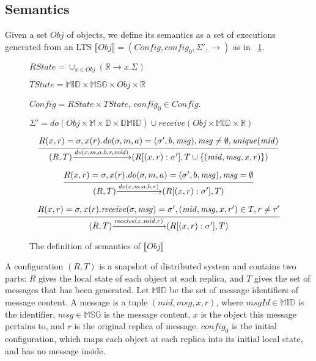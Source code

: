 \forget
{
\subsection{Semantics}
\label{subsec:semantics}

Given a set $\mathit{Obj}$ of objects, we define its semantics as a set of executions generated from an LTS $\llbracket \mathit{Obj} \rrbracket = (\mathit{Config},\mathit{config}_0,\Sigma',\rightarrow)$ as in \figurename~\ref{fig:the semantics of multiple objects}.

\begin{figure}[ht]
$\mathit{RState} = \cup_{x \in \mathit{Obj}} (\mathbb{R} \rightarrow x.\Sigma)$

$\mathit{TState} = \mathbb{MID} \times \mathbb{MSG} \times \mathit{Obj} \times \mathbb{R}$

$\mathit{Config} = \mathit{RState} \times \mathit{TState}$, $\mathit{config}_0 \in \mathit{Config}$.

$\Sigma' = \mathit{do}(\mathit{Obj} \times \mathbb{M} \times \mathbb{D} \times \mathbb{D} \mathbb{MID}) \cup \mathit{receive}(\mathit{Obj} \times \mathbb{MID} \times \mathbb{R})$

\[
\begin{array}{l c}
\bigfrac{ R(x,r) = \sigma, x(r).\mathit{do}(\sigma,m,a) = (\sigma',b,\mathit{msg}), \mathit{msg} \neq \emptyset, \mathit{unique}(\mathit{mid}) }
{ (R,T) {\xrightarrow{\mathit{do}(x,m,a,b,r,\mathit{mid})}} (R[(x,r):\sigma'],T \cup \{ (\mathit{mid},\mathit{msg},x,r) \}) }
\end{array}
\]

\[
\begin{array}{l c}
\bigfrac{ R(x,r) = \sigma, x(r).\mathit{do}(\sigma,m,a) = (\sigma',b,\mathit{msg}), \mathit{msg} = \emptyset }
{ (R,T) {\xrightarrow{\mathit{do}(x,m,a,b,r)}} (R[(x,r):\sigma'],T ) }
\end{array}
\]

\[
\begin{array}{l c}
\bigfrac{ R(x,r) = \sigma, x(r).\mathit{receive}(\sigma,\mathit{msg}) = \sigma',(\mathit{mid},\mathit{msg},x,r') \in T, r \neq r'}
{ (R,T) {\xrightarrow{\mathit{receive}(x,\mathit{mid},r)}} (R[(x,r):\sigma'],T) }
\end{array}
\]
\caption{The definition of semantics of $\llbracket \mathit{Obj} \rrbracket$}
\label{fig:the semantics of multiple objects}
\end{figure}

A configuration $(R,T)$ is a snapshot of distributed system and contains two parts: $R$ gives the local state of each object at each replica, and $T$ gives the set of messages that has been generated. Let $\mathbb{MID}$ be the set of message identifiers of message content. A message is a tuple $(\mathit{mid},\mathit{msg},x,r)$, where $\mathit{msgId} \in \mathbb{MID}$ is the identifier, $\mathit{msg} \in \mathbb{MSG}$ is the message content, $x$ is the object this message pertains to, and $r$ is the original replica of message. $\mathit{config}_0$ is the initial configuration, which maps each object at each replica into its initial local state, and has no message inside.

}

